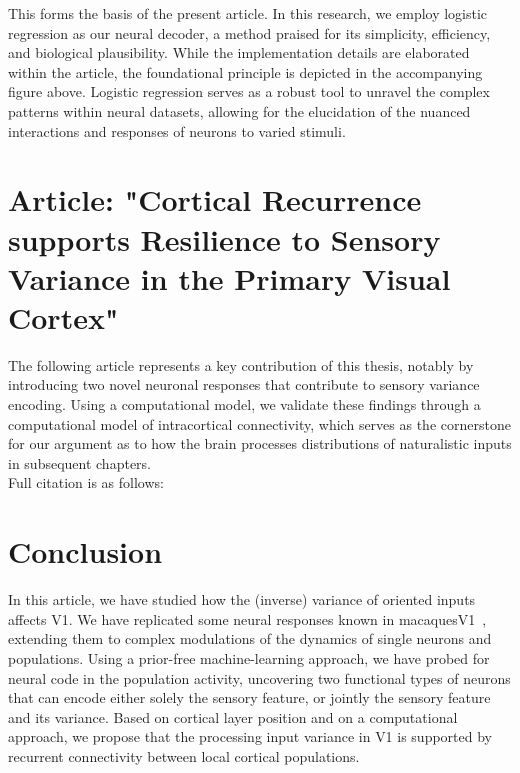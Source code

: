 This forms the basis of the present article. In this research, we employ logistic regression as our neural decoder, a method praised for its simplicity, efficiency, and biological plausibility. While the implementation details are elaborated within the article, the foundational principle is depicted in the accompanying figure above. Logistic regression serves as a robust tool to unravel the complex patterns within neural datasets, allowing for the elucidation of the nuanced interactions and responses of neurons to varied stimuli.





\section{Article: "Cortical Recurrence supports Resilience to Sensory Variance in the Primary Visual Cortex"}
The following article represents a key contribution of this thesis, notably by introducing two novel neuronal responses that contribute to sensory variance encoding. Using a computational model, we validate these findings through a computational model of intracortical connectivity, which serves as the cornerstone for our argument as to how the brain processes distributions of naturalistic inputs in subsequent chapters.\\ 

Full citation is as follows: 




\section{Conclusion}
In this article, we have studied how the (inverse) variance of oriented inputs affects \gls{V1}. We have replicated some neural responses known in macaques\gls{V1}~\cite{goris2015origin}, extending them to complex modulations of the dynamics of single neurons and populations. Using a prior-free machine-learning approach, we have probed for neural code in the population activity, uncovering two functional types of neurons that can encode either solely the sensory feature, or jointly the sensory feature and its variance. Based on cortical layer position and on a computational approach, we propose that the processing input variance in \gls{V1} is supported by recurrent connectivity between local cortical populations.

